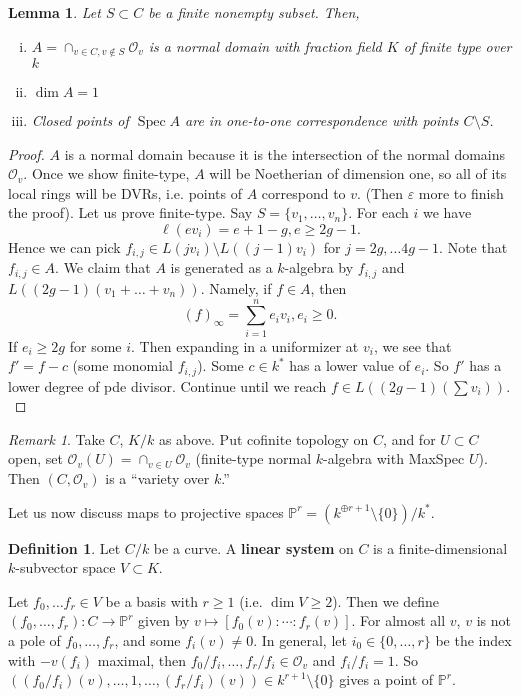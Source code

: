 \documentclass{article}
\newcommand{\Proj}{\mathbb{P}}
\DeclareMathOperator{\Spec}{Spec}
\theoremstyle{plain}
\newtheorem{lem}[thm]{Lemma}
\theoremstyle{definition}
\newtheorem{defn}{Definition}
\theoremstyle{remark}
\newtheorem*{rem}{Remark}
\begin{document}
\begin{lem}
\label{L102}
Let $S\subset C$ be a finite nonempty subset. Then,
\begin{enumerate}[(i)]
\item $A=\cap_{v\in C,v\notin S}\mathcal{O}_v$ is a normal domain with fraction field $K$ of finite type over $k$
\item $\dim A=1$
\item Closed points of $\Spec A$ are in one-to-one correspondence with points $C\setminus S$.
\end{enumerate}
\end{lem}
\begin{proof}
$A$ is a normal domain because it is the intersection of the normal domains $\mathcal{O}_v$. Once we show finite-type, $A$ will be Noetherian of dimension one, so all of its local rings will be DVRs, i.e. points of $A$ correspond to $v$. (Then $\varepsilon$ more to finish the proof). Let us prove finite-type. Say $S=\{v_1,\ldots,v_n\}$. For each $i$ we have
\[\ell(ev_i)=e+1-g, e\geq 2g-1.\]
Hence we can pick $f_{i,j}\in L(jv_i)\setminus L((j-1)v_i)$ for $j=2g,\ldots 4g-1$. Note that $f_{i,j}\in A$. We claim that $A$ is generated as a $k$-algebra by $f_{i,j}$ and $L((2g-1)(v_1+\ldots+v_n))$. Namely, if $f\in A$, then
\[(f)_\infty =\sum_{i=1}^n e_iv_i, e_i\geq 0.\]
If $e_i\geq 2g$ for some $i$. Then expanding in a uniformizer at $v_i$, we see
that $f'=f-c$ (some monomial $f_{i,j}$). Some $c\in k^*$ has a lower value of $e_i$. So $f'$ has a lower degree of pde divisor. Continue until we reach $f\in L((2g-1)(\sum v_i)).$
\end{proof}

\begin{rem}
Take $C$, $K/k$ as above. Put cofinite topology on $C$, and for $U\subset C$ open, set $\mathcal{O}_v(U)=\cap_{v\in U}\mathcal{O}_v$ (finite-type normal $k$-algebra with MaxSpec $U$). Then $(C,\mathcal{O}_v)$ is a ``variety over $k$.''
\end{rem}

Let us now discuss maps to projective spaces $\Proj^r=(k^{\oplus r+1}\setminus \{0\})/k^*$.
\begin{defn}
Let $C/k$ be a curve. A \textbf{linear system} on $C$ is a finite-dimensional $k$-subvector space $V\subset K$.
\end{defn}

Let $f_0,\ldots f_r\in V$ be a basis with $r\geq 1$ (i.e. $\dim V\geq 2$). Then we define $(f_0,\ldots, f_r):C\to \Proj^r$ given by $v\mapsto [f_0(v):\cdots:f_r(v)]$. For almost all $v$, $v$ is not a pole of $f_0,\ldots,f_r$, and some $f_i(v)\neq 0$. In general, let $i_0\in\{0,\ldots, r\}$ be the index with $-v(f_i)$ maximal, then $f_0/f_i,\ldots,f_r/f_i\in\mathcal{O}_v$ and $f_i/f_i=1$. So $((f_0/f_i)(v),\ldots,1,\ldots,(f_r/f_i)(v))\in k^{r+1}\setminus \{0\}$ gives a point  of $\Proj^r$.
\end{document}
